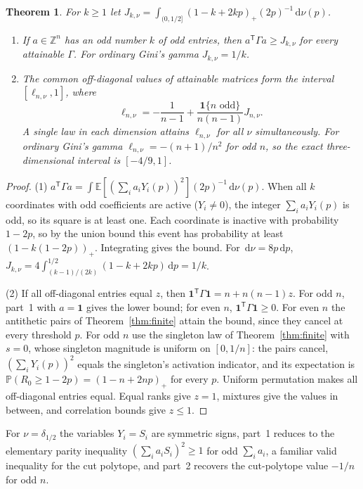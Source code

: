 \documentclass[11pt,a4paper]{article}
\newtheorem{theorem}{Theorem}[section]
\theoremstyle{remark}
\newcommand{\EE}{\mathbb{E}}
\newcommand{\PP}{\mathbb{P}}
\newcommand{\dd}{\,\mathrm d}
\newcommand{\ind}{\mathbf 1}
\begin{document}
\begin{theorem}\label{thm:gini}
For $k\geq1$ let $J_{k,\nu}=\int_{(0,1/2]}(1-k+2kp)_+(2p)^{-1}\dd\nu(p)$.
\begin{enumerate}
\item If $a\in\mathbb Z^n$ has an odd number $k$ of odd entries, then $a^{\mathsf T}\Gamma a\geq J_{k,\nu}$ for every attainable $\Gamma$. For ordinary Gini's gamma $J_{k,\nu}=1/k$.
\item The common off-diagonal values of attainable matrices form the interval $[\ell_{n,\nu},1]$, where
\[
 \ell_{n,\nu}=-\frac1{n-1}+\frac{\ind\{n\text{ odd}\}}{n(n-1)}J_{n,\nu}.
\]
A single law in each dimension attains $\ell_{n,\nu}$ for all $\nu$ simultaneously. For ordinary Gini's gamma $\ell_{n,\nu}=-(n+1)/n^2$ for odd $n$, so the exact three-dimensional interval is $[-4/9,1]$.
\end{enumerate}
\end{theorem}
\begin{proof}
(1) $a^{\mathsf T}\Gamma a=\int\EE[(\sum_ia_iY_i(p))^2](2p)^{-1}\dd\nu(p)$. When all $k$ coordinates with odd coefficients are active ($Y_i\neq0$), the integer $\sum_ia_iY_i(p)$ is odd, so its square is at least one. Each coordinate is inactive with probability $1-2p$, so by the union bound this event has probability at least $(1-k(1-2p))_+$. Integrating gives the bound. For $\dd\nu=8p\dd p$, $J_{k,\nu}=4\int_{(k-1)/(2k)}^{1/2}(1-k+2kp)\dd p=1/k$.

(2) If all off-diagonal entries equal $z$, then $\ind^{\mathsf T}\Gamma\ind=n+n(n-1)z$. For odd $n$, part~1 with $a=\ind$ gives the lower bound; for even $n$, $\ind^{\mathsf T}\Gamma\ind\geq0$. For even $n$ the antithetic pairs of Theorem~\ref{thm:finite} attain the bound, since they cancel at every threshold $p$. For odd $n$ use the singleton law of Theorem~\ref{thm:finite} with $s=0$, whose singleton magnitude is uniform on $[0,1/n]$: the pairs cancel, $(\sum_iY_i(p))^2$ equals the singleton's activation indicator, and its expectation is $\PP(R_0\geq1-2p)=(1-n+2np)_+$ for every $p$. Uniform permutation makes all off-diagonal entries equal. Equal ranks give $z=1$, mixtures give the values in between, and correlation bounds give $z\leq1$.
\end{proof}

For $\nu=\delta_{1/2}$ the variables $Y_i=S_i$ are symmetric signs, part~1 reduces to the elementary parity inequality $(\sum_ia_iS_i)^2\geq1$ for odd $\sum_ia_i$, a familiar valid inequality for the cut polytope, and part~2 recovers the cut-polytope value $-1/n$ for odd $n$.
\end{document}
